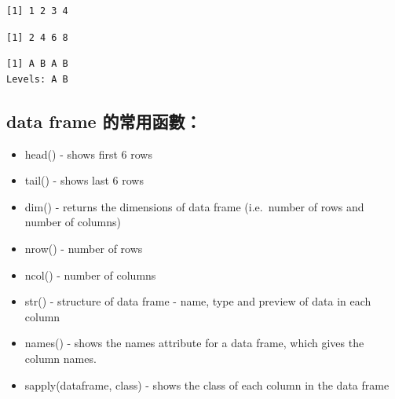 \documentclass[]{book}
\newenvironment{Shaded}{\begin{snugshade}}{\end{snugshade}}
\newcommand{\NormalTok}[1]{#1}
\newcommand{\OperatorTok}[1]{\textcolor[rgb]{0.81,0.36,0.00}{\textbf{#1}}}
\providecommand{\tightlist}{%
  \setlength{\itemsep}{0pt}\setlength{\parskip}{0pt}}
\theoremstyle{definition}
\theoremstyle{definition}
\theoremstyle{definition}
\theoremstyle{remark}
\begin{document}
\begin{Shaded}
\end{Shaded}

\begin{verbatim}
[1] 1 2 3 4
\end{verbatim}

\begin{Shaded}
\end{Shaded}

\begin{verbatim}
[1] 2 4 6 8
\end{verbatim}

\begin{Shaded}
\end{Shaded}

\begin{verbatim}
[1] A B A B
Levels: A B
\end{verbatim}

\hypertarget{data-frame-}{%
\subsection{data frame 的常用函數：}\label{data-frame-}}

\begin{itemize}
\tightlist
\item
  head() - shows first 6 rows
\item
  tail() - shows last 6 rows
\item
  dim() - returns the dimensions of data frame (i.e.~number of rows and
  number of columns)
\item
  nrow() - number of rows
\item
  ncol() - number of columns
\item
  str() - structure of data frame - name, type and preview of data in
  each column
\item
  names() - shows the names attribute for a data frame, which gives the
  column names.
\item
  sapply(dataframe, class) - shows the class of each column in the data
  frame
\end{itemize}
\end{document}
